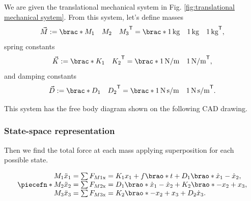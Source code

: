 \documentclass[12pt]{article}
\DeclarePairedDelimiter\brao()%
\DeclarePairedDelimiter\brac[]%
\DeclarePairedDelimiter\piecefn\{.
\newcommand*\transpose{\mathsf{T}}
\begin{document}
We are given the translational mechanical system in Fig. \ref{fig:translational mechanical system}. From this system, let's define masses
\begin{equation}
    \vec{M} := \brac*{
        \begin{matrix} M_1 & M_2 & M_3 \end{matrix}
    }^\transpose = \brac*{
        \begin{matrix} \SI1{\kilo\gram} & \SI1{\kilo\gram} & \SI1{\kilo\gram} \end{matrix}
    }^\transpose,
\end{equation}
spring constants
\begin{equation}
    \vec{K} := \brac*{
        \begin{matrix} K_1 & K_2 \end{matrix}
    }^\transpose = \brac*{
        \begin{matrix} \SI1{\newton\per\meter} & \SI1{\newton\per\meter} \end{matrix}
    }^\transpose,
\end{equation}
and damping constants
\begin{equation}
    \vec{D} := \brac*{
        \begin{matrix} D_1 & D_2 \end{matrix}
    }^\transpose = \brac*{
        \begin{matrix} \SI1{\newton\second\per\meter} & \SI1{\newton\second\per\meter} \end{matrix}
    }^\transpose.
\end{equation}

This system has the free body diagram shown on the following CAD drawing.


\subsubsection{State-space representation}

Then we find the total force at each mass applying superposition for each possible state.

\begin{equation}
    \piecefn*{
        \begin{array}{@{}l@{}}
            M_1 \ddot{x}_1 = \sum F_{M1\mathrm{x}} = K_1 x_1 + f\brao*t + D_1 \brao*{\dot{x}_1 - \dot{x}_2},
        \\*
            M_2 \ddot{x}_2 = \sum F_{M2\mathrm{x}} = D_1\brao*{\dot{x}_1 - \dot{x}_2} + K_2\brao*{-x_2 + x_3},
        \\*
            M_3 \ddot{x}_3 = \sum F_{M3\mathrm{x}} = K_2\brao*{-x_2 + x_3} + D_2\dot{x}_3.
        \\*
        \end{array}
    }
\end{equation}
\end{document}
